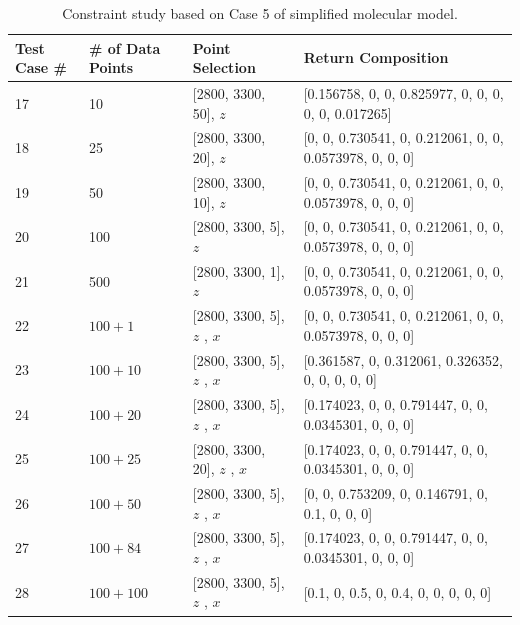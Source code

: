 \begin{table} 
\begin{center} \tiny
{\def\arraystretch{1.5}
\begin{tabular}{| p{1cm} | p{2cm} | p{4cm}  | l |}
\hline
Test Case \# & \# of Data Points & Point Selection & Return Composition \\ \hline
17 & 10 & [2800, 3300, 50], $z$ & [0.156758, 0, 0, 0.825977, 0, 0, 0, 0, 0, 0.017265] \\ \hline
18 & 25 & [2800, 3300, 20], $z$ & [0, 0, 0.730541, 0, 0.212061, 0, 0, 0.0573978, 0, 0, 0] \\ \hline
19 & 50 & [2800, 3300, 10], $z$ & [0, 0, 0.730541, 0, 0.212061, 0, 0, 0.0573978, 0, 0, 0] \\ \hline
20 & 100 & [2800, 3300, 5], $z$ & [0, 0, 0.730541, 0, 0.212061, 0, 0, 0.0573978, 0, 0, 0] \\ \hline
21 & 500 & [2800, 3300, 1], $z$ & [0, 0, 0.730541, 0, 0.212061, 0, 0, 0.0573978, 0, 0, 0] \\ \hline	
22 & $100 + 1$ & [2800, 3300, 5], $z$ \newline [2800, 3300, 500], $x$  & [0, 0, 0.730541, 0, 0.212061, 0, 0, 0.0573978, 0, 0, 0] \\ \hline
23 & $100 + 10$ & [2800, 3300, 5], $z$ \newline [2800, 3300, 50], $x$  & [0.361587, 0, 0.312061, 0.326352, 0, 0, 0, 0, 0] \\ \hline
24 & $100 + 20$ & [2800, 3300, 5], $z$ \newline [2800, 3300, 25], $x$  & [0.174023, 0, 0, 0.791447, 0, 0, 0.0345301, 0, 0, 0] \\ \hline
25 & $100 + 25$ & [2800, 3300, 20], $z$ \newline [2800, 3300, 20], $x$  & [0.174023, 0, 0, 0.791447, 0, 0, 0.0345301, 0, 0, 0] \\ \hline
26 & $100 + 50$ & [2800, 3300, 5], $z$ \newline [2800, 3300, 10], $x$  & [0, 0, 0.753209, 0, 0.146791, 0, 0.1, 0, 0, 0] \\ \hline
27 & $100 + 84$ & [2800, 3300, 5], $z$ \newline [2800, 3300, 6], $x$  & [0.174023, 0, 0, 0.791447, 0, 0, 0.0345301, 0, 0, 0] \\ \hline
28 & $100 + 100$ & [2800, 3300, 5], $z$ \newline [2800, 3300, 5], $x$  & [0.1, 0, 0.5, 0, 0.4, 0, 0, 0, 0, 0] \\ 
\hline
\end{tabular} \\
}
\caption{Constraint study based on Case 5 of simplified molecular model.}\label{tab:7.4}
\end{center}
\end{table}